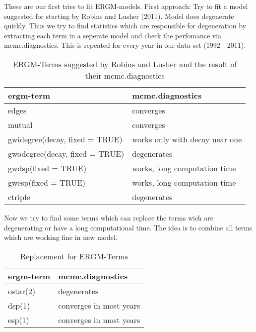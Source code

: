 \documentclass{article}
\begin{document}
These are our first tries to fit ERGM-models. First approach: Try to fit a model suggested for starting by Robins and Lusher (2011). Model does degenerate quickly. Thus we try to find statistics which are responsible for degeneration by extracting each term in a seperate model and check the perfomance via mcmc.diagnostics. This is repeated for every year in our data set (1992 - 2011).
\begin{table}[h]
	\centering
	\caption{ERGM-Terms suggested by Robins and Lusher and the result of their mcmc.diagnostics}
		\begin{tabular}{l|l}
		
		\hline
		ergm-term 											& mcmc.diagnostics 								\\
		\hline
		edges														& converges												\\
		mutual													& converges												\\
		gwidegree(decay, fixed = TRUE)	& works only with decay near one	\\
		gwodegree(decay, fixed = TRUE) 	& degenerates											\\
		gwdsp(fixed = TRUE)							& works, long computation time		\\
		gwesp(fixed = TRUE)							& works, long computation time		\\
		ctriple													& degenerates											\\
		
		\hline
						
		\end{tabular}
	
	\label{tab:stats.robins}
\end{table}

Now we try to find some terms which can replace the terms wich are degenerating or have a long computational time. The idea is to combine all terms which are working fine in new model.


\begin{table}[h]
	\centering
	\caption{Replacement for ERGM-Terms}
		\begin{tabular}{l|l}
		
		\hline
		ergm-term 											& mcmc.diagnostics	 								\\
		\hline
		ostar(2)												& degenerates											 	\\
		dsp(1)													& converges in most years 					\\
		esp(1)													& converges in most years	  				\\
	
		\hline
						
		\end{tabular}
	
	\label{tab:stats.replace}
\end{table}
\end{document}
